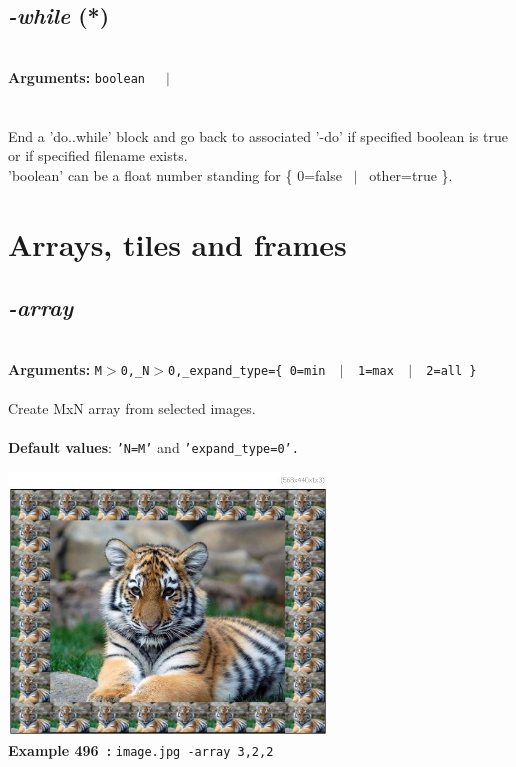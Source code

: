 \documentclass[a4paper,11pt,twoside]{book}
\begin{document}
\subsection{\emph{-while} (*)}\vspace*{-0.5em}
~\\\textbf{Arguments: } 
{\small \texttt{boolean}}~~~$|$\\
\\~\\
End a 'do..while' block and go back to associated '-do'
if specified boolean is true or if specified filename exists.
~\\'boolean' can be a float number standing for \{ 0=false ~$|$~ other=true \}.

\section{Arrays, tiles and frames}


\subsection{\emph{-array} }\vspace*{-0.5em}
~\\\textbf{Arguments: } 
{\small \texttt{M$>$0,\_N$>$0,\_expand\_type=\{ 0=min ~$|$~ 1=max ~$|$~ 2=all \}}}\\~\\
Create MxN array from selected images.
~\\~\\\textbf{Default values}: {\small \texttt{'N=M'} and \texttt{'expand\_type=0'.}}
\begin{center}\includegraphics[keepaspectratio=true,height=7cm,width=\textwidth]{img/gmic_def496.jpg}\\
{\footnotesize \textbf{Example 496~:} \texttt{image.jpg -array 3,2,2}}
\end{center}
\end{document}
